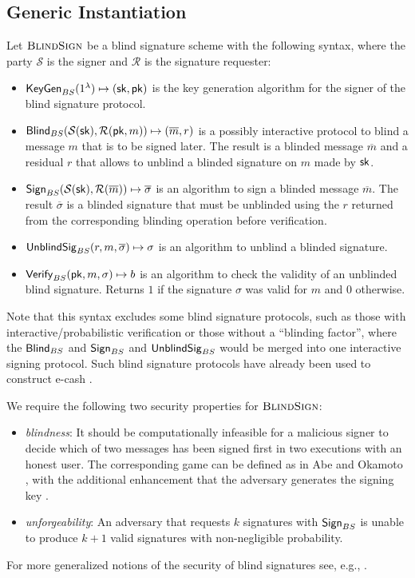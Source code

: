 \subsection{Generic Instantiation}\label{sec:crypto:instantiation}
Let $\textsc{BlindSign}$ be a blind signature scheme with the following syntax, where the party $\mathcal{S}$
is the signer and $\mathcal{R}$ is the signature requester:
\begin{itemize}
  \item $\mathsf{KeyGen}_{BS}(1^\lambda) \mapsto (\mathsf{sk}, \mathsf{pk})$ is the key generation algorithm
    for the signer of the blind signature protocol.
  \item $\mathsf{Blind}_{BS}(\mathcal{S}(\mathsf{sk}), \mathcal{R}(\mathsf{pk}, m)) \mapsto (\overline{m}, r)$ is a possibly interactive protocol
    to blind a message $m$ that is to be signed later.  The result is a blinded message $\overline{m}$ and
    a residual $r$ that allows to unblind a blinded signature on $m$ made by $\mathsf{sk}$.
  \item $\mathsf{Sign}_{BS}(\mathcal{S}(\mathsf{sk}), \mathcal{R}(\overline{m})) \mapsto
    \overline{\sigma}$ is an algorithm to sign a blinded message $\overline{m}$.
    The result $\overline{\sigma}$ is a blinded signature that must be unblinded
    using the $r$ returned from the corresponding blinding operation before
    verification.
  \item $\mathsf{UnblindSig}_{BS}(r, m, \overline{\sigma}) \mapsto \sigma$
    is an algorithm to unblind a blinded signature.
  \item $\mathsf{Verify}_{BS}(\mathsf{pk}, m, \sigma) \mapsto b$ is an algorithm to
    check the validity of an unblinded blind signature.  Returns $1$ if the
    signature $\sigma$ was valid for $m$ and $0$ otherwise.
\end{itemize}

Note that this syntax excludes some blind signature protocols, such as those
with interactive/probabilistic verification or those without a ``blinding
factor'', where the $\mathsf{Blind}_{BS}$ and $\mathsf{Sign}_{BS}$ and
$\mathsf{UnblindSig}_{BS}$ would be merged into one interactive signing protocol.
Such blind signature protocols have already been used to construct e-cash
\cite{camenisch2005compact}.

We require the following two security properties for $\textsc{BlindSign}$:
\begin{itemize}
  \item \emph{blindness}: It should be computationally infeasible for a
    malicious signer to decide which of two messages has been signed first
    in two executions with an honest user.  The corresponding game can be defined as
    in Abe and Okamoto \cite{abe2000provably}, with the additional enhancement
    that the adversary generates the signing key \cite{schroder2017security}.
  \item \emph{unforgeability}:  An adversary that requests $k$ signatures with $\mathsf{Sign}_{BS}$
    is unable to produce $k+1$ valid signatures with non-negligible probability.
\end{itemize}
For more generalized notions of the security of blind signatures see, e.g.,
\cite{fischlin2009security,schroder2017security}.

